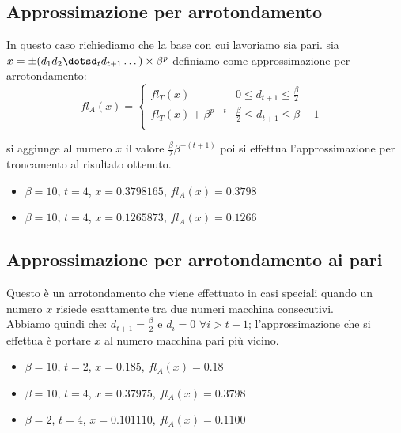 \documentclass[12pt, a4paper]{book}
\theoremstyle{definition}
\begin{document}
\subsection{Approssimazione per arrotondamento}
\begin{flushleft}
In questo caso richiediamo che la base con cui lavoriamo sia pari.
sia $x = \pm(d_{1}d_{2}\dotsd_{t}d_{t+1}\dots)\times \beta^{p}$ definiamo come approssimazione per arrotondamento:
\[
fl_{A}(x) = 
\begin{cases}
  fl_{T}(x) & \text{$0 \leq d_{t+1} \leq \frac{\beta}{2}$ } \\
  fl_{T}(x) + \beta^{p-t} & \text{$\frac{\beta}{2} \leq d_{t+1} \leq \beta - 1$ } \\
\end{cases}
\]

si aggiunge al numero $x$ il valore $\frac{\beta}{2}\beta^{-(t+1)}$ poi si effettua l'approssimazione per troncamento al risultato ottenuto.
\end{flushleft}

\begin{itemize}
  	\item $\beta = 10$,  $t=4$,  $x = 0.3798165$,  $fl_{A}(x) =  0.3798$
  	\item $\beta = 10$,  $t=4$,  $x = 0.1265873$,  $fl_{A}(x) =  0.1266$
\end{itemize}

\subsection{Approssimazione per arrotondamento ai pari}
\begin{flushleft}
Questo è un arrotondamento che viene effettuato in casi speciali quando un numero $x$ risiede esattamente tra due numeri macchina consecutivi.\\
Abbiamo quindi che: $d_{t+1} = \frac{\beta}{2}$ e $d_{i} = 0$ $\forall i > t + 1$; l'approssimazione che si effettua è portare $x$ al numero macchina pari più vicino.  

\begin{itemize}
  	\item $\beta = 10$,  $t=2$,  $x = 0.185 $,  $fl_{A}(x) =  0.18$
  	\item $\beta = 10$,  $t=4$,  $x = 0.37975 $,  $fl_{A}(x) =  0.3798$
  	\item $\beta = 2$,  $t=4$,  $x = 0.101110$,  $fl_{A}(x) =  0.1100$
\end{itemize}
\end{flushleft}
\newpage
\end{document}

